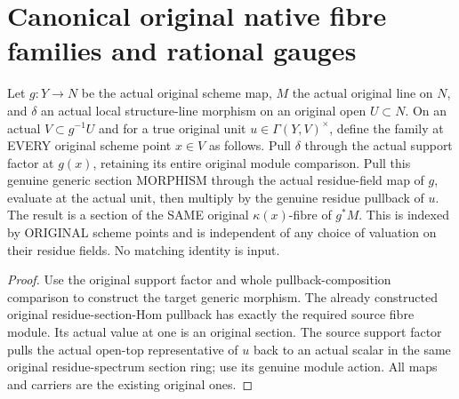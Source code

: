\section{Canonical original native fibre families and rational gauges}

\begin{definition}
\label{def:intrinsic-numerical-canonical-hom-unit-fibre-family}
\leanok
{}
Let $g:Y\to N$ be the actual original scheme map, $M$ the actual original
line on $N$, and $\delta$ an actual local structure-line morphism on an
original open $U\subset N$. On an actual $V\subset g^{-1}U$ and for a
true original unit $u\in\Gamma(Y,V)^\times$, define the family at EVERY
original scheme point $x\in V$ as follows. Pull $\delta$ through the actual
support factor at $g(x)$, retaining its entire original module comparison.
Pull this genuine generic section MORPHISM through the actual residue-field
map of $g$, evaluate at the actual unit, then multiply by the genuine residue
pullback of $u$. The result is a section of the SAME original $\kappa(x)$-fibre
of $g^*M$. This is indexed by ORIGINAL scheme points and is independent of any
choice of valuation on their residue fields. No matching identity is input.
\end{definition}
\begin{proof}
Use the original support factor and whole pullback-composition comparison to
construct the target generic morphism. The already constructed original
residue-section-Hom pullback has exactly the required source fibre module.
Its actual value at one is an original section. The source support factor
pulls the actual open-top representative of $u$ back to an actual scalar in
the same original residue-spectrum section ring; use its genuine module
action. All maps and carriers are the existing original ones.
\end{proof}

